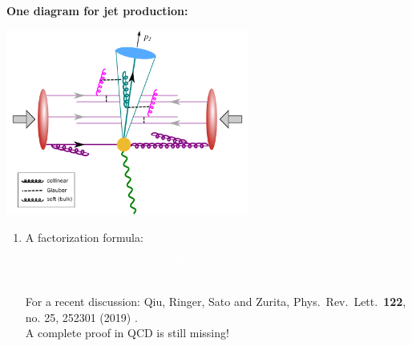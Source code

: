 \documentclass[9pt,a4paper,unknownkeysallowed,xcolor=dvipsnames,aspectratio=43]{beamer}
\begin{document}
%
%
\begin{frame}{\bf\huge One diagram for jet production:}
\vspace{4mm}
\begin{center}
\includegraphics[width=0.6\textwidth]{fig/AA}\\
\end{center}
\begin{enumerate}
\item{\color{white}A factorization formula:}
\begin{align}
\color{white}
\frac{d\sigma}{dp_{T} d\eta} =\sum\limits_{abc}f_a\otimes f_b \otimes \hat{\sigma}_{ab\to c}\otimes J_c^{med}\notag
\end{align}
\begin{center}
{\tiny{\color{white}  For a recent discussion: 
  Qiu, Ringer, Sato and Zurita,
  Phys.\ Rev.\ Lett.\  {\bf 122}, no. 25, 252301 (2019)
  .
  }}\\
    \vspace{2mm}
 {\color{white}A complete proof in QCD is still missing!}

\end{center}
\end{enumerate}
\end{frame}
%
%
\end{document}
